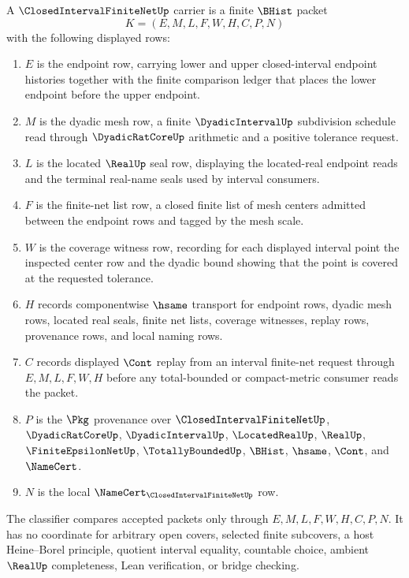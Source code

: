 \begin{definition}
\label{def:closed-interval-finite-net-carrier}
A $\ClosedIntervalFiniteNetUp$ carrier is a finite $\BHist$ packet
$$
K=(E,M,L,F,W,H,C,P,N)
$$
with the following displayed rows:
\begin{enumerate}
\item $E$ is the endpoint row, carrying lower and upper closed-interval endpoint histories together with the finite comparison ledger that places the lower endpoint before the upper endpoint.
\item $M$ is the dyadic mesh row, a finite $\DyadicIntervalUp$ subdivision schedule read through $\DyadicRatCoreUp$ arithmetic and a positive tolerance request.
\item $L$ is the located $\RealUp$ seal row, displaying the located-real endpoint reads and the terminal real-name seals used by interval consumers.
\item $F$ is the finite-net list row, a closed finite list of mesh centers admitted between the endpoint rows and tagged by the mesh scale.
\item $W$ is the coverage witness row, recording for each displayed interval point the inspected center row and the dyadic bound showing that the point is covered at the requested tolerance.
\item $H$ records componentwise $\hsame$ transport for endpoint rows, dyadic mesh rows, located real seals, finite net lists, coverage witnesses, replay rows, provenance rows, and local naming rows.
\item $C$ records displayed $\Cont$ replay from an interval finite-net request through $E,M,L,F,W,H$ before any total-bounded or compact-metric consumer reads the packet.
\item $P$ is the $\Pkg$ provenance over $\ClosedIntervalFiniteNetUp$, $\DyadicRatCoreUp$, $\DyadicIntervalUp$, $\LocatedRealUp$, $\RealUp$, $\FiniteEpsilonNetUp$, $\TotallyBoundedUp$, $\BHist$, $\hsame$, $\Cont$, and $\NameCert$.
\item $N$ is the local $\NameCert_{\ClosedIntervalFiniteNetUp}$ row.
\end{enumerate}
The classifier compares accepted packets only through $E,M,L,F,W,H,C,P,N$. It has no coordinate for arbitrary open covers, selected finite subcovers, a host Heine--Borel principle, quotient interval equality, countable choice, ambient $\RealUp$ completeness, Lean verification, or bridge checking.
\end{definition}

